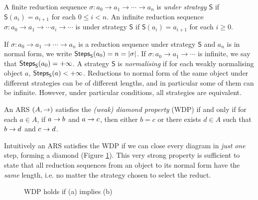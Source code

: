 \begin{definition}
	A finite reduction sequence $\sigma:a_0\rightarrow a_1\rightarrow\cdots\rightarrow a_n$ is \emph{under strategy} $\mathsf{S}$ if $\mathsf{S}(a_i)=a_{i+1}$ for each $0\leq i<n$. An infinite reduction sequence $\sigma:a_0\rightarrow a_1\rightarrow\cdots a_i\rightarrow\cdots$ is under strategy $\mathsf{S}$ if $\mathsf{S}(a_i)=a_{i+1}$ for each $i\geq 0$.
\end{definition}
If $\sigma:a_0\rightarrow a_1\rightarrow\cdots\rightarrow a_n$ is a
reduction sequence under strategy $\mathsf{S}$ and $a_n$ is in normal
form, we write $\textsf{Steps}_{\mathsf{S}}(a_0)=n=|\sigma|$. If
$\sigma:a_0\rightarrow a_1\rightarrow\cdots$ is infinite, we say that
$\textsf{Steps}_{\mathsf{S}}(a_0)=+\infty$. A strategy $\mathsf{S}$ is \emph{normalising} if for each weakly normalising object $a$, $\textsf{Steps}_{\mathsf{S}}(a)<+\infty$. Reductions to normal form of the same object under different strategies can be of different lengths, and in particular some of them can be infinite. However, under particular conditions, all strategies are equivalent.
\begin{definition}[WDP]
	An ARS $(A,\rightarrow)$ satisfies the \emph{(weak) diamond property} (WDP) if and only if for each $a\in A$, if $a\rightarrow b$ and $a\rightarrow c$, then either $b=c$ or there exists $d\in A$ such that $b\rightarrow d$ and $c\rightarrow d$. 
\end{definition}
Intuitively an ARS satisfies the WDP if we can close every diagram in \emph{just one} step, forming a diamond (Figure \ref{figure:diam}). This very strong property is sufficient to state that all reduction sequences from an object to its normal form have the \emph{same} length, i.e. no matter the strategy chosen to select the reduct.
\begin{figure}
	\caption{WDP holds if (a) implies (b)}
	\label{figure:diam}
\end{figure}
